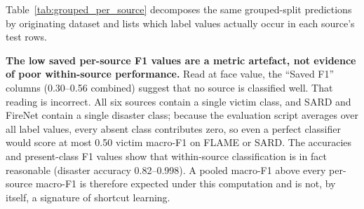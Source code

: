 \documentclass[journal]{IEEEtran}
\begin{document}
Table~\ref{tab:grouped_per_source} decomposes the same grouped-split predictions by originating dataset and lists which label values actually occur in each source's test rows.

\begin{table}[!t]
\centering
\caption[Grouped-split results by source dataset]{Grouped-split results by source dataset (AdapFuse-v1, $n=11{,}097$). Saved F1 averages over all classes, so classes absent from a source score zero; Present-class F1 averages only the classes present.}
\label{tab:grouped_per_source}
\end{table}

\textbf{The low saved per-source F1 values are a metric artefact, not evidence of poor within-source performance.} Read at face value, the ``Saved F1'' columns (0.30--0.56 combined) suggest that no source is classified well. That reading is incorrect. All six sources contain a single victim class, and SARD and FireNet contain a single disaster class; because the evaluation script averages over all label values, every absent class contributes zero, so even a perfect classifier would score at most 0.50 victim macro-F1 on FLAME or SARD. The accuracies and present-class F1 values show that within-source classification is in fact reasonable (disaster accuracy 0.82--0.998). A pooled macro-F1 above every per-source macro-F1 is therefore expected under this computation and is not, by itself, a signature of shortcut learning.
\end{document}
